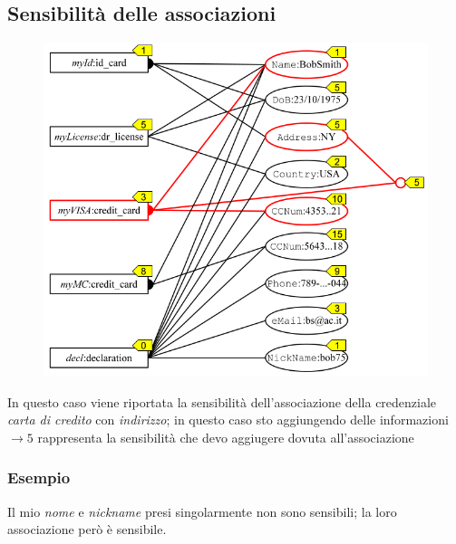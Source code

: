\documentclass{report}
\begin{document}
\subsection{Sensibilità delle associazioni}
\begin{figure}[ht]
    \centering
    \includegraphics[width=1\linewidth]{images/sens-ass-1.png}
\end{figure}
In questo caso viene riportata la sensibilità dell'associazione della credenziale 
\textit{carta di credito} con \textit{indirizzo}; in questo caso sto aggiungendo 
delle informazioni $\rightarrow 5$ rappresenta la sensibilità che devo aggiugere dovuta all'associazione

\subsubsection{Esempio}
Il mio \textit{nome} e \textit{nickname} presi singolarmente non sono sensibili; la loro 
associazione però è sensibile.
\end{document}
